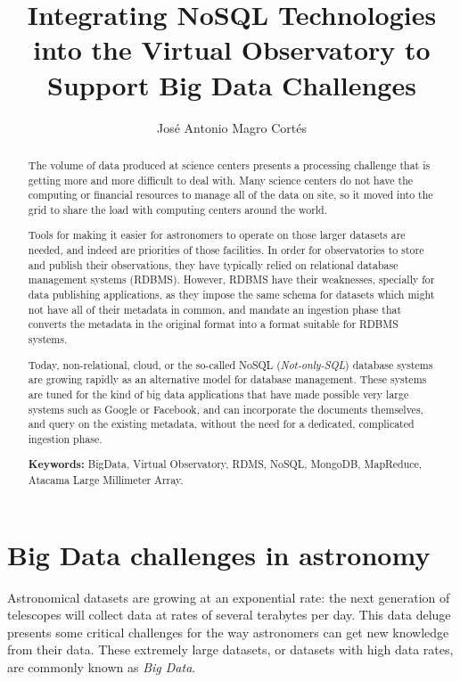 \documentclass[a4paper,12pt]{article}
\title{Integrating NoSQL Technologies
 into the Virtual Observatory to
   Support Big Data Challenges
}
\author{José Antonio Magro Cortés}
\begin{document}
\maketitle


\begin{abstract}

The volume of data produced at science centers presents a processing challenge that is getting more and more difficult to deal with. Many science centers do not have the computing or financial resources to manage all of the data on site, so it moved into the grid to share the load with computing centers around the world.  \newline

Tools for making it easier for astronomers to operate on those larger datasets are needed, and indeed are priorities of those facilities. In order for observatories to store and publish their observations, they have typically relied on relational database management systems (RDBMS). However, RDBMS have their weaknesses, specially for data publishing applications, as they impose the same schema for datasets which might not have all of their metadata in common, and mandate an ingestion phase that converts the metadata in the original format into a format suitable for RDBMS systems. \newline

Today, non-relational, cloud, or the so-called NoSQL (\emph{Not-only-SQL}) database systems
are growing rapidly as an alternative model for database management. These systems are tuned for the kind of big data applications that have made possible very large systems such as Google or Facebook, and can incorporate the documents themselves, and query on the existing metadata, without the need for a dedicated, complicated ingestion phase.


\smallskip
\noindent
\textbf{Keywords: } BigData, Virtual Observatory, RDMS, NoSQL, MongoDB, MapReduce, Atacama Large Millimeter Array.


\end{abstract}




\section{Big Data challenges in astronomy}

Astronomical datasets are growing at an exponential rate: the next generation of telescopes will collect data at rates of several terabytes per day. This data deluge presents some critical challenges for the way astronomers can get new knowledge from their data. These extremely large datasets, or datasets with high data rates, are commonly known as \emph{Big Data}. \newline
\end{document}
